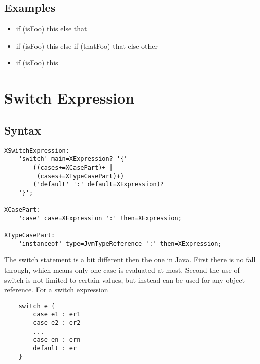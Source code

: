 \documentclass[a4paper,10pt]{scrreprt}
\newlength{\itemindentlen}
\begin{document}
\subsection{Examples}

\setlength{\itemindentlen}{\textwidth}
\begin{itemize}
\addtolength{\itemindentlen}{-2em}

\item \begin{minipage}[t]{\itemindentlen}
if (isFoo) this else that
\end{minipage}

\item \begin{minipage}[t]{\itemindentlen}
if (isFoo) this else if (thatFoo) that else other
\end{minipage}

\item \begin{minipage}[t]{\itemindentlen}
if (isFoo) this
\end{minipage}

\end{itemize}
\addtolength{\itemindentlen}{2em}







\section{Switch Expression\label{SwitchExpression}}


\subsection{Syntax}
\begin{lstlisting}
XSwitchExpression:
	'switch' main=XExpression? '{'
		((cases+=XCasePart)+ |
		 (cases+=XTypeCasePart)+)
		('default' ':' default=XExpression)?
	'}';

XCasePart:
	'case' case=XExpression ':' then=XExpression;	

XTypeCasePart:
	'instanceof' type=JvmTypeReference ':' then=XExpression;	

\end{lstlisting}


The switch statement is a bit different then the one in Java. First there is no fall through, which means only one case is evaluated at most.
Second the use of switch is not limited to certain values, but instead can be used for any object reference. 
For a switch expression 
\begin{lstlisting}
	switch e {
		case e1 : er1
		case e2 : er2
		...
		case en : ern
		default : er
	}

\end{lstlisting}
\end{document}
